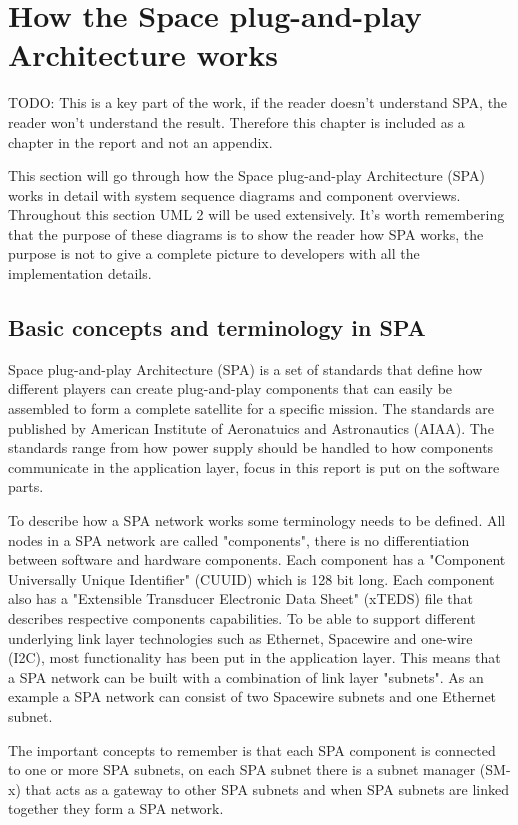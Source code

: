 \chapter{How the Space plug-and-play Architecture works}\label{ch:spa}
TODO: This is a key part of the work, if the reader doesn't understand SPA, the
reader won't understand the result. Therefore this chapter is included as a
chapter in the report and not an appendix.

This section will go through how the Space plug-and-play Architecture (SPA)
works in detail with system sequence diagrams and component overviews.
Throughout this section UML 2 will be used extensively. It's worth remembering
that the purpose of these diagrams is to show the reader how SPA works, the
purpose is not to give a complete picture to developers with all the
implementation details.

\section{Basic concepts and terminology in SPA}
Space plug-and-play Architecture (SPA) is a set of standards that define how
different players can create plug-and-play components that can easily be
assembled to form a complete satellite for a specific mission. The standards
are published by American Institute of Aeronatuics and Astronautics (AIAA). The
standards range from how power supply should be handled to how components
communicate in the application layer, focus in this report is put on the
software parts.

To describe how a SPA network works some terminology needs to be defined. All
nodes in a SPA network are called "components", there is no differentiation
between software and hardware components. Each component has a "Component
Universally Unique Identifier" (CUUID) which is 128 bit long. Each component
also has a "Extensible Transducer Electronic Data Sheet" (xTEDS) file that
describes respective components capabilities. To be able to support different
underlying link layer technologies such as Ethernet, Spacewire and one-wire
(I2C), most functionality has been put in the application layer. This means
that a SPA network can be built with a combination of link layer "subnets". As
an example a SPA network can consist of two Spacewire subnets and one Ethernet
subnet.

The important concepts to remember is that each SPA component is
connected to one or more SPA subnets, on each SPA subnet there is a subnet
manager (SM-x) that acts as a gateway to other SPA subnets and when SPA subnets
are linked together they form a SPA network.

